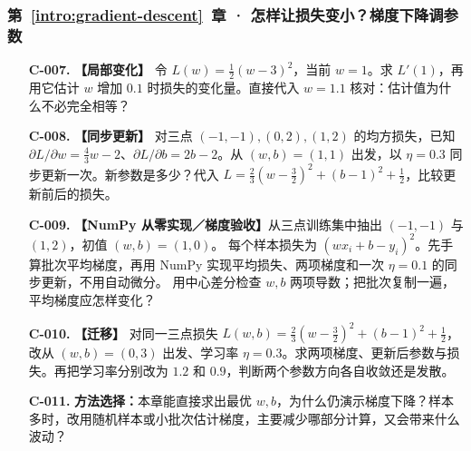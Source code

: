 \subsubsection*{第~\ref*{intro:gradient-descent}~章 · 怎样让损失变小？梯度下降调参数}
\begin{enumerate}[label={},leftmargin=4.8em,itemsep=4pt]
\item[\textbf{C-007.}] \leavevmode{}\label{exercise:C-007}\label{exercise:local-derivative-change}\textbf{【局部变化】} 令 $L(w)=\tfrac12(w-3)^2$，当前 $w=1$。求 $L'(1)$，再用它估计 $w$ 增加 $0.1$ 时损失的变化量。直接代入 $w=1.1$ 核对：估计值为什么不必完全相等？
\item[\textbf{C-008.}] \leavevmode{}\label{exercise:C-008}\label{exercise:synchronous-gradient-step}\textbf{【同步更新】} 对三点 $(-1,-1),(0,2),(1,2)$ 的均方损失，已知 $\partial L/\partial w=\tfrac43w-2$、$\partial L/\partial b=2b-2$。从 $(w,b)=(1,1)$ 出发，以 $\eta=0.3$ 同步更新一次。新参数是多少？代入 $L=\tfrac23(w-\tfrac32)^2+(b-1)^2+\tfrac12$，比较更新前后的损失。
\item[\textbf{C-009.}] \leavevmode{}\label{exercise:C-009}\label{exercise:mini-batch-gradient-average}\textbf{【NumPy 从零实现／梯度验收】}从三点训练集中抽出 $(-1,-1)$ 与 $(1,2)$，初值 $(w,b)=(1,0)$。
每个样本损失为 $(wx_i+b-y_i)^2$。先手算批次平均梯度，再用 NumPy 实现平均损失、两项梯度和一次 $\eta=0.1$ 的同步更新，不用自动微分。
用中心差分检查 $w,b$ 两项导数；把批次复制一遍，平均梯度应怎样变化？
\item[\textbf{C-010.}] \leavevmode{}\label{exercise:C-010}\label{exercise:quadratic-gradient-transfer}\textbf{【迁移】} 对同一三点损失 $L(w,b)=\tfrac23(w-\tfrac32)^2+(b-1)^2+\tfrac12$，改从 $(w,b)=(0,3)$ 出发、学习率 $\eta=0.3$。求两项梯度、更新后参数与损失。再把学习率分别改为 $1.2$ 和 $0.9$，判断两个参数方向各自收敛还是发散。
\item[\textbf{C-011.}] \leavevmode{}\label{exercise:C-011}\label{exercise:iterative-method-choice}\textbf{方法选择：}本章能直接求出最优 $w,b$，为什么仍演示梯度下降？样本多时，改用随机样本或小批次估计梯度，主要减少哪部分计算，又会带来什么波动？
\end{enumerate}
